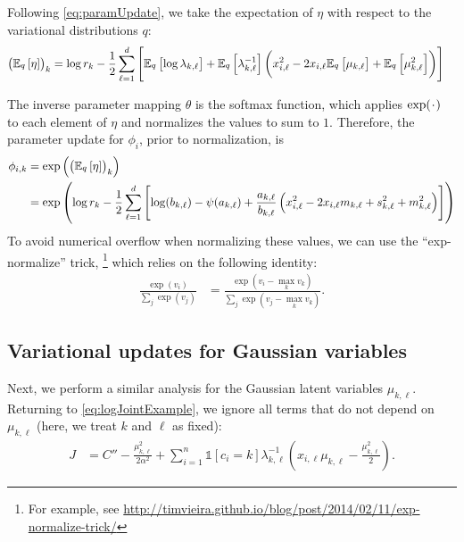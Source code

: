 \documentclass[11pt]{article}
\newcommand*{\placeholder}{\makebox[1ex]{$\cdot$}}
\begin{document}
Following \eqref{eq:paramUpdate}, we take the expectation of $\eta$ with respect to the variational distributions $q$:
\begin{align}
\left( \mathbb{E}_{\substack{q}}\left[ \eta \right] \right)_k
&=
\log r_k - \frac{1}{2} \sum_{\ell=1}^d \left[ \mathbb{E}_{\substack{q}}\left[ \log \lambda_{k,\ell} \right] + \mathbb{E}_{\substack{q}}\left[ \lambda_{k,\ell}^{-1} \right] \left( x_{i,\ell}^2 - 2 x_{i,\ell} \mathbb{E}_{\substack{q}}\left[ \mu_{k,\ell} \right] + \mathbb{E}_{\substack{q}}\left[ \mu_{k,\ell}^2 \right] \right) \right]
\end{align}

The inverse parameter mapping $\theta$ is the softmax function, which applies $\exp(\placeholder)$ to each element of $\eta$ and normalizes the values to sum to $1$.
Therefore, the parameter update for $\phi_i$, prior to normalization, is
\begin{align}
\phi_{i,k}
&= \exp\left( \left( \mathbb{E}_{\substack{q}}\left[ \eta \right] \right)_k \right) \\
\label{eq:exVarUpdatePhi}
&=
\exp \left(
\log r_k - \frac{1}{2} \sum_{\ell=1}^d
    \left[
        \log(b_{k,\ell}) - \psi(a_{k,\ell}) + \frac{a_{k,\ell}}{b_{k,\ell}}
        \left(
            x_{i,\ell}^2 - 2 x_{i,\ell} m_{k,\ell} + s_{k,\ell}^2 + m_{k,\ell}^2
        \right)
    \right]
\right)
\end{align}
To avoid numerical overflow when normalizing these values, we can use the ``exp-normalize'' trick,%
\footnote{For example, see \url{http://timvieira.github.io/blog/post/2014/02/11/exp-normalize-trick/}}
which relies on the following identity:
\begin{align}
\frac{\exp(v_i)}{\sum_j \exp(v_j)}
&= \frac{\exp(v_i - \max_k v_k)}{\sum_j \exp(v_j - \max_k v_k)}.
\end{align}

\subsection{Variational updates for Gaussian variables}

Next, we perform a similar analysis for the Gaussian latent variables $\mu_{k,\ell}$.
Returning to \eqref{eq:logJointExample}, we ignore all terms that do not depend on $\mu_{k,\ell}$ (here, we treat $k$ and $\ell$ as fixed):
\begin{align}
J
&=
    C'' - \frac{\mu_{k, \ell}^2}{2\alpha^2}
    + \sum_{i=1}^n \mathds{1}[c_i = k] \lambda_{k,\ell}^{-1} \left( x_{i,\ell} \mu_{k,\ell} - \frac{\mu_{k,\ell}^2}{2} \right)
    .
\end{align}
\end{document}
